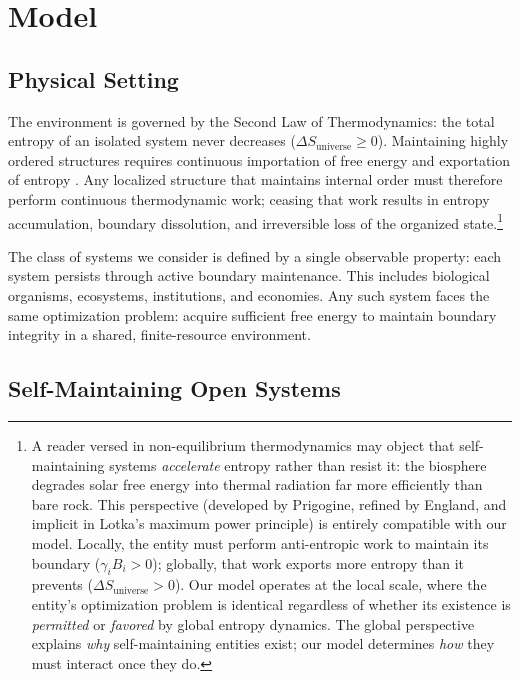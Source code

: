 \documentclass[11pt]{article}
\theoremstyle{plain}
\theoremstyle{definition}
\theoremstyle{remark}
\let\origsection\section
\renewcommand{\section}{\needspace{12\baselineskip}\origsection}
\let\origsubsection\subsection
\renewcommand{\subsection}{\needspace{7\baselineskip}\origsubsection}
\begin{document}
\section{Model}\label{model}

\subsection{Physical Setting}\label{physical-setting}

The environment is governed by the Second Law of Thermodynamics: the
total entropy of an isolated system never decreases
(\(\Delta S_{\text{universe}} \geq 0\)). Maintaining highly ordered
structures requires continuous importation of free energy and
exportation of entropy \citep{Clausius1865, Boltzmann1877, Planck1897}.
Any localized structure that maintains internal order must therefore
perform continuous thermodynamic work; ceasing that work results in
entropy accumulation, boundary dissolution, and irreversible loss of the
organized state.\footnote{A reader versed in non-equilibrium
  thermodynamics may object that self-maintaining systems
  \emph{accelerate} entropy rather than resist it: the biosphere
  degrades solar free energy into thermal radiation far more efficiently
  than bare rock. This perspective (developed by Prigogine, refined by
  England, and implicit in Lotka's maximum power principle) is entirely
  compatible with our model. Locally, the entity must perform
  anti-entropic work to maintain its boundary (\(\gamma_i B_i > 0\));
  globally, that work exports more entropy than it prevents
  (\(\Delta S_{\text{universe}} > 0\)). Our model operates at the local
  scale, where the entity's optimization problem is identical regardless
  of whether its existence is \emph{permitted} or \emph{favored} by
  global entropy dynamics. The global perspective explains \emph{why}
  self-maintaining entities exist; our model determines \emph{how} they
  must interact once they do.}

The class of systems we consider is defined by a single observable
property: each system persists through active boundary maintenance. This
includes biological organisms, ecosystems, institutions, and economies.
Any such system faces the same optimization problem: acquire sufficient
free energy to maintain boundary integrity in a shared, finite-resource
environment.

\subsection{Self-Maintaining Open
Systems}\label{self-maintaining-open-systems}
\end{document}
